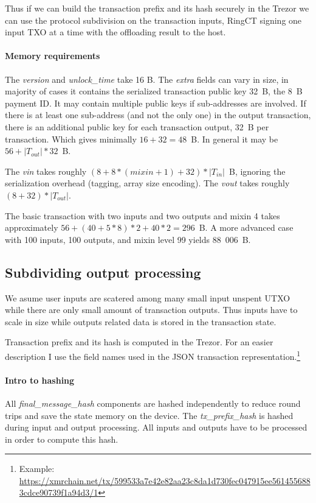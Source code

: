 \documentclass[]{article}
\begin{document}
Thus if we can build the transaction prefix and its hash securely in the Trezor we can use the protocol subdivision on the transaction inputs, RingCT signing one input TXO at a time with the offloading result to the host. 

\paragraph{Memory requirements}
The \emph{version} and \emph{unlock\_time} take 16 B. The \emph{extra} fields can vary in size, in majority of cases it contains the serialized transaction public key 32~B, the 8~B payment ID. It may contain multiple public keys if sub-addresses are involved. If there is at least one sub-address (and not the only one) in the output transaction, there is an additional public key for each transaction output, 32~B per transaction. Which gives minimally $16 + 32 = 48$~B. In general it may be $56 + \left|T_{out}\right| * 32$~B.

The \emph{vin} takes roughly $(8 + 8 * (mixin + 1) + 32) * \left|T_{in}\right|$~B, ignoring the serialization overhead (tagging, array size encoding). The \emph{vout} takes roughly $(8 + 32) * \left|T_{out}\right|$.

The basic transaction with two inputs and two outputs and mixin 4 takes approximately $56 + (40 + 5*8)*2 + 40*2 = 296$~B. A more advanced case with 100 inputs, 100 outputs, and mixin level 99 yields 88~006~B.  

\subsection{Subdividing output processing}
We asume user inputs are scatered among many small input unspent UTXO while there are only small amount of transaction outputs. Thus inputs have to scale in size while outputs related data is stored in the transaction state.

Transaction prefix and its hash is computed in the Trezor.
For an easier description I use the field names used in the JSON transaction representation.\footnote{Example: \url{https://xmrchain.net/tx/599533a7e42e82aa23c8da1d730fec047915ee5614556883cdce90739f1a94d3/1}}

\paragraph{Intro to hashing}
All \emph{final\_message\_hash} components are hashed independently to reduce round trips and save the state memory on the device.
The \emph{tx\_prefix\_hash} is hashed during input and output processing. All inputs and outputs have to be processed in order to compute this hash.
\end{document}
